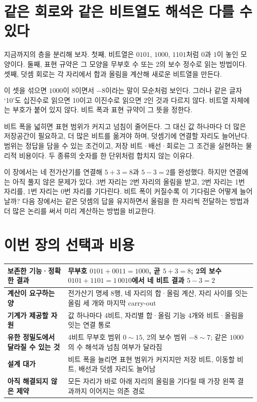 \section{같은 회로와 같은 비트열도 해석은 다를 수 있다}

지금까지의 층을 분리해 보자. 첫째, 비트열은 \(0101\), \(1000\), \(1101\)처럼 \(0\)과 \(1\)이 놓인 모양이다. 둘째, 표현 규약은 그 모양을 무부호 수 또는 2의 보수 정수로 읽는 방법이다. 셋째, 덧셈 회로는 각 자리에서 합과 올림을 계산해 새로운 비트열을 만든다.

이 셋을 섞으면 \(1000\)이 8이면서 \(-8\)이라는 말이 모순처럼 보인다. 그러나 같은 글자 ‘10’도 십진수로 읽으면 10이고 이진수로 읽으면 2인 것과 다르지 않다. 비트열 자체에는 부호가 붙어 있지 않다. 비트 폭과 표현 규약이 그 뜻을 정한다.

비트 폭을 넓히면 표현 범위가 커지고 넘침이 줄어든다. 그 대신 값 하나마다 더 많은 저장공간이 필요하고, 더 많은 비트를 옮겨야 하며, 덧셈기에 연결할 자리도 늘어난다. 범위는 정답을 담을 수 있는 조건이고, 저장 비트·배선·회로는 그 조건을 실현하는 물리적 비용이다. 두 종류의 숫자를 한 단위처럼 합치지 않는 이유다.

이 장에서는 네 전가산기를 연결해 \(5+3=8\)과 \(5-3=2\)를 완성했다. 하지만 연결에는 아직 풀지 않은 문제가 있다. 3번 자리는 2번 자리의 올림을 받고, 2번 자리는 1번 자리를, 1번 자리는 0번 자리를 기다린다. 비트 폭이 커질수록 이 기다림은 어떻게 늘어날까? 다음 장에서는 같은 덧셈의 답을 유지하면서 올림을 한 자리씩 전달하는 방법과 더 많은 논리를 써서 미리 계산하는 방법을 비교한다.

\section*{이번 장의 선택과 비용}

\begin{center}
\small
\begin{tabular}{>{\raggedright\arraybackslash\sffamily\bfseries}p{} >{\raggedright\arraybackslash}p{}}
\toprule
보존한 기능·정확한 결과 & 무부호 \(0101+0011=1000\), 곧 \(5+3=8\); 2의 보수 \(0101+1101=1\,0010\)에서 네 비트 결과 \(5-3=2\) \\
\midrule
계산이 요구하는 양 & 전가산기 명세 8행, 네 자리의 합·올림 계산, 자리 사이를 잇는 올림 세 개와 마지막 carry-out \\
\midrule
기계가 제공할 자원 & 값 하나마다 4비트, 자리별 합·올림 기능 4개와 비트·올림을 잇는 연결 통로 \\
\midrule
유한 정밀도에서 달라질 수 있는 것 & 4비트 무부호 범위 \(0\sim15\), 2의 보수 범위 \(-8\sim7\); 같은 \(1000\)의 수 해석과 넘침 여부가 달라짐 \\
\midrule
설계 대가 & 비트 폭을 늘리면 표현 범위가 커지지만 저장 비트, 이동할 비트, 배선과 덧셈 자리도 늘어남 \\
\midrule
아직 해결되지 않은 제약 & 모든 자리가 바로 아래 자리의 올림을 기다릴 때 가장 왼쪽 결과까지 이어지는 의존 경로 \\
\bottomrule
\end{tabular}
\end{center}
